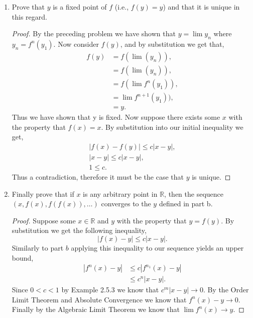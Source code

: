 \documentclass[12pt]{article}
\makeatletter
\theoremstyle{homework}
\newenvironment{exercise}[1]
{\def\@currentlabel{#1}\exercisecore}
{\endexercisecore}
\newcommand{\Reals}{\ensuremath{\mathbb R}}
\makeatother
\begin{document}
\begin{exercise}{4}
\begin{enumerate}
    \item Prove that $y$ is a fixed point of $f$ (i.e., $f(y) = y$) and that it is unique in this regard. \\
    \begin{proof}
      By the preceding problem we have shown that $y = \lim y_n$ where $y_{n} = f^n(y_1)$. Now consider $f(y)$, and by substitution we get that,
      \begin{align*}
        f(y) &= f(\lim(y_n)),\\
         &= f(\lim(y_n)),\\
         &= f(\lim f^n(y_1)),\\
         &= \lim f^{n+1}(y_1)),\\
         &= y.
      \end{align*}
      Thus we have shown that y is fixed. Now suppose there exists some $x$ with the property that $f(x) = x$. By substitution into our initial inequality we get,
      \begin{align*}
        |f(x) - f(y)| \le c|x - y|,\\
        |x - y| \le c|x - y|,\\
        1 \le c.
      \end{align*}
      Thus a contradiction, therefore it must be the case that $y$ is unique.
    \end{proof}
    \vspace{.25in}

    \item Finally prove that if $x$ is any arbitrary point in $\Reals$, then the sequence $(x,f(x), f(f(x)),\dots)$ converges to the $y$ defined in part b.\\
    \begin{proof}
      Suppose some $x \in \Reals$ and $y$ with the property that $y = f(y)$. By substitution we get the following inequality,
      \begin{equation*}
        |f(x) - y| \le c|x - y|.
      \end{equation*}
      Similarly to part $b$ applying this inequality to our sequence yields an upper bound,
      \begin{align*}
        |f^n(x) - y| &\le c|f^{n_1}(x) - y|\\
         &\le c^n|x - y|.
      \end{align*}
      Since $0<c<1$ by Example 2.5.3 we know that $c^m|x - y| \to 0$. By the Order Limit Theorem and Absolute Convergence we know that $f^n(x) - y \to 0$.
      Finally by the Algebraic Limit Theorem we know that $\lim f^n(x) \to y$.
    
    \end{proof}
  \end{enumerate}
\end{exercise}
\vspace{.5in}
\end{document}
